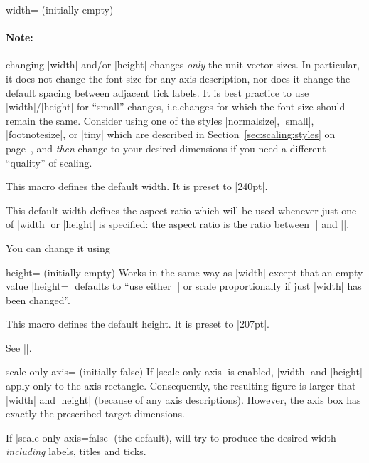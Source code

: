 \begin{pgfplotskey}{width= (initially empty)}
    \paragraph{Note:}

    changing |width| and/or |height| changes \emph{only} the unit vector sizes.
    In particular, it does not change the font size for any axis description,
    nor does it change the default spacing between adjacent tick labels. It is
    best practice to use |width|/|height| for ``small'' changes, i.e.\@ changes
    for which the font size should remain the same. Consider using one of the
    styles |normalsize|, |small|, |footnotesize|, or |tiny| which are described
    in Section~\ref{sec:scaling:styles} on page~\pageref{sec:scaling:styles},
    and \emph{then} change to your desired dimensions if you need a different
    ``quality'' of scaling.

    \begin{command}{\axisdefaultwidth}
        This macro defines the default width. It is preset to |240pt|.

        This default width defines the aspect ratio which will be used whenever
        just one of |width| or |height| is specified: the aspect ratio is the
        ratio between |\axisdefaultwidth| and |\axisdefaultheight|.

        You can change it using
\begin{codeexample}
\def\axisdefaultwidth{10cm}
\end{codeexample}
    \end{command}
\end{pgfplotskey}

\begin{pgfplotskey}{height= (initially empty)}
    Works in the same way as |width| except that an empty value |height={}|
    defaults to ``use either |\axisdefaultheight| or scale proportionally if
    just |width| has been changed''.

    \begin{command}{\axisdefaultheight}
        This macro defines the default height. It is preset to |207pt|.

        See |\axisdefaultwidth|.
    \end{command}
\end{pgfplotskey}

\begin{pgfplotskey}{scale only axis= (initially false)}
    If |scale only axis| is enabled, |width| and |height| apply only to the
    axis rectangle. Consequently, the resulting figure is larger that |width|
    and |height| (because of any axis descriptions). However, the axis box has
    exactly the prescribed target dimensions.

    If |scale only axis=false| (the default), \PGFPlots{} will try to produce
    the desired width \emph{including} labels, titles and ticks.
\end{pgfplotskey}

